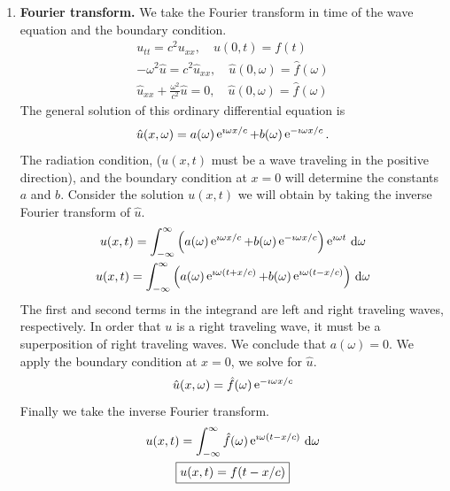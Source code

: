 {\begin{Solution}
\begin{enumerate}
  \item
    \textbf{Fourier transform.}
    We take the Fourier transform in time of the wave equation and the boundary
    condition.
    \begin{gather*}
      u_{t t} = c^2 u_{x x}, \quad u(0, t) = f(t) 
      \\
      - \omega^2 \hat{u} = c^2 \hat{u}_{x x}, \quad \hat{u}(0, \omega) = \hat{f}(\omega) 
      \\
      \hat{u}_{x x} + \frac{\omega^2}{c^2} \hat{u} = 0, \quad \hat{u}(0, \omega) = \hat{f}(\omega) 
    \end{gather*}
    The general solution of this ordinary differential equation is
    \[
    \hat{u}(x, \omega) = a(\omega) \mathop{\mathrm{e}}\nolimits^{\imath \omega x / c} + b(\omega) \mathop{\mathrm{e}}\nolimits^{-\imath \omega x / c}.
    \]
    The radiation condition, ($u(x, t)$ must be a wave traveling in the 
    positive direction), and the boundary condition at $x = 0$ will determine 
    the constants $a$ and $b$.  Consider the solution $u(x,t)$ we will obtain
    by taking the inverse Fourier transform of $\hat{u}$.
    \begin{gather*}
      u(x,t) = \int_{-\infty}^\infty \left( a(\omega) \mathop{\mathrm{e}}\nolimits^{\imath \omega x / c} + b(\omega) \mathop{\mathrm{e}}\nolimits^{-\imath \omega x / c} \right) 
      \mathop{\mathrm{e}}\nolimits^{\imath \omega t} \,\mathrm{d} \omega 
      \\
      u(x, t) = \int_{-\infty}^\infty \left( a(\omega) \mathop{\mathrm{e}}\nolimits^{\imath \omega (t + x / c)} + b(\omega) \mathop{\mathrm{e}}\nolimits^{\imath \omega (t - x / c)} \right) 
      \,\mathrm{d} \omega 
    \end{gather*}
    The first and second terms in the integrand are left and right traveling 
    waves, respectively.  In order that $u$ is a right traveling wave, it must 
    be a superposition of right traveling waves.  We conclude that $a(\omega) = 0$.
    We apply the boundary condition at $x = 0$, we solve for $\hat{u}$.
    \[
    \hat{u}(x, \omega) = \hat{f}(\omega) \mathop{\mathrm{e}}\nolimits^{- \imath \omega x / c}
    \]
    Finally we take the inverse Fourier transform.
    \begin{gather*}
      u(x, t) = \int_{-\infty}^\infty \hat{f}(\omega) \mathop{\mathrm{e}}\nolimits^{\imath \omega (t - x / c)} \,\mathrm{d} \omega 
      \\
      \boxed{
        u(x, t) = f(t - x/c)
        }
    \end{gather*}
  \end{enumerate}
\end{Solution}








}
